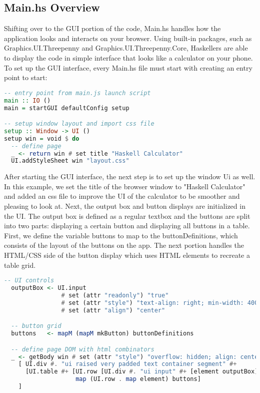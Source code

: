 \documentclass{article}
\begin{document}
\subsection{Main.hs Overview}
Shifting over to the GUI portion of the code, Main.hs handles how the application looks and interacts on your browser. Using built-in packages, such as Graphics.UI.Threepenny and Graphics.UI.Threepenny.Core, Haskellers are able to display the code in simple interface that looks like a calculator on your phone. To set up the GUI interface, every Main.hs file must start with creating an entry point to start:

\begin{lstlisting}[language=Haskell]
-- entry point from main.js launch script
main :: IO ()
main = startGUI defaultConfig setup

-- setup window layout and import css file
setup :: Window -> UI ()
setup win = void $ do
  -- define page
  _ <- return win # set title "Haskell Calculator"
  UI.addStyleSheet win "layout.css"
\end{lstlisting}

\noindent
After starting the GUI interface, the next step is to set up the window Ui as well. In this example, we set the title of the browser window to "Haskell Calculator" and added an css file to improve the UI of the calculator to be smoother and pleasing to look at. Next, the output box and button displays are initialized in the UI. The output box is defined as a regular textbox and the buttons are split into two parts: displaying a certain button and displaying all buttons in a table. First, we define the variable buttons to map to the buttonDefinitions, which consists of the layout of the buttons on the app. The next portion handles the HTML/CSS side of the button display which uses HTML elements to recreate a table grid.

\begin{lstlisting}[language=Haskell]
-- UI controls
  outputBox <- UI.input
                # set (attr "readonly") "true"
                # set (attr "style") "text-align: right; min-width: 400px; min-height: 40px; font-size:24px"
                # set (attr "align") "center"

  -- button grid
  buttons   <- mapM (mapM mkButton) buttonDefinitions

  -- define page DOM with html combinators
  _ <- getBody win # set (attr "style") "overflow: hidden; align: center" #+
    [ UI.div #. "ui raised very padded text container segment" #+
      [UI.table #+ [UI.row [UI.div #. "ui input" #+ [element outputBox]]] #+ 
                    map (UI.row . map element) buttons]
    ]
\end{lstlisting}
\end{document}
